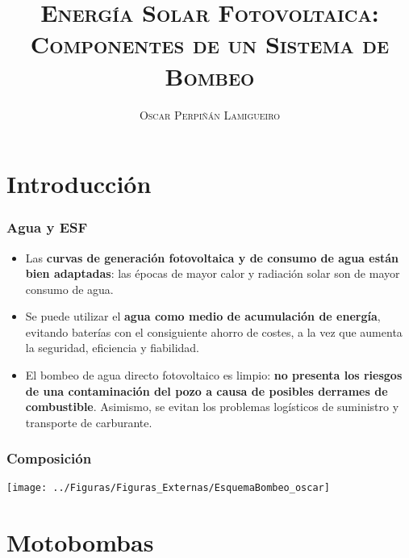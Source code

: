 \documentclass[serif, xcolor=dvipsnames]{beamer}
\begin{document}
\title[\textsc{ESF: Componentes Bombeo}]{\textsc{Energía Solar Fotovoltaica:}\\
\textsc{Componentes de un Sistema de Bombeo}}


\author{\textsc{Oscar Perpiñán Lamigueiro}}
\date{}

\frame[plain]{\titlepage}


%

\section{Introducción}


\begin{frame}
\frametitle{Agua y ESF}
\begin{itemize}
\item Las \textbf{curvas de generación fotovoltaica y de consumo de agua
están bien adaptadas}: las épocas de mayor calor y radiación solar
son de mayor consumo de agua. 
\item Se puede utilizar el \textbf{agua como medio de acumulación de energía},
evitando baterías con el consiguiente ahorro de costes, a la vez que
aumenta la seguridad, eficiencia y fiabilidad.
\item El bombeo de agua directo fotovoltaico es limpio: \textbf{no presenta
los riesgos de una contaminación del pozo a causa de posibles derrames
de combustible}. Asimismo, se evitan los problemas logísticos de suministro
y transporte de carburante.
\end{itemize}

\end{frame}

\begin{frame}[plain]
\frametitle{Composición}

\begin{center}
\texttt{[image: ../Figuras/Figuras\_Externas/EsquemaBombeo\_oscar]}
\par\end{center}


\end{frame}

\section{Motobombas}
\end{document}
